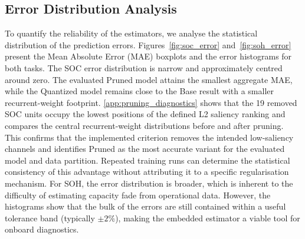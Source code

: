 \documentclass[final,3p,times]{elsarticle}
\begin{document}
\subsection{Error Distribution Analysis}
To quantify the reliability of the estimators, we analyse the statistical distribution of the prediction errors. Figures~\ref{fig:soc_error} and~\ref{fig:soh_error} present the Mean Absolute Error (MAE) boxplots and the error histograms for both tasks.
The SOC error distribution is narrow and approximately centred around zero. The evaluated Pruned model attains the smallest aggregate MAE, while the Quantized model remains close to the Base result with a smaller recurrent-weight footprint. \ref{app:pruning_diagnostics} shows that the 19 removed SOC units occupy the lowest positions of the defined L2 saliency ranking and compares the central recurrent-weight distributions before and after pruning. This confirms that the implemented criterion removes the intended low-saliency channels and identifies Pruned as the most accurate variant for the evaluated model and data partition. Repeated training runs can determine the statistical consistency of this advantage without attributing it to a specific regularisation mechanism.
For SOH, the error distribution is broader, which is inherent to the difficulty of estimating capacity fade from operational data. However, the histograms show that the bulk of the errors are still contained within a useful tolerance band (typically $\pm 2\%$), making the embedded estimator a viable tool for onboard diagnostics.
\end{document}
